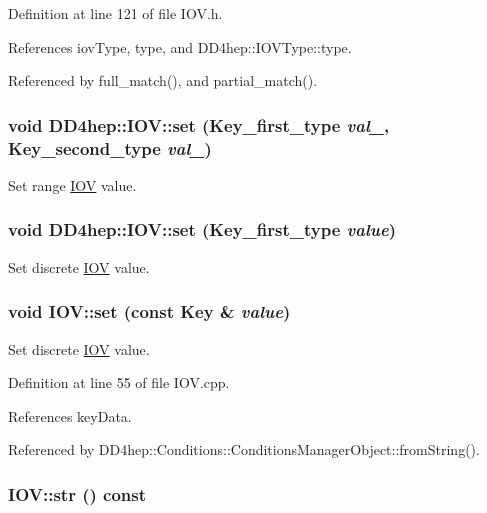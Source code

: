 Definition at line 121 of file IOV.h.

References iovType, type, and DD4hep::IOVType::type.

Referenced by full\_\-match(), and partial\_\-match().\hypertarget{class_d_d4hep_1_1_i_o_v_ab1157ed01d8a99029c6d2cfc9379ac9b}{
\subsubsection[{set}]{\setlength{\rightskip}{0pt plus 5cm}void DD4hep::IOV::set ({\bf Key\_\-first\_\-type} {\em val\_}, \/  {\bf Key\_\-second\_\-type} {\em val\_})}}
\label{class_d_d4hep_1_1_i_o_v_ab1157ed01d8a99029c6d2cfc9379ac9b}


Set range \hyperlink{class_d_d4hep_1_1_i_o_v}{IOV} value. \hypertarget{class_d_d4hep_1_1_i_o_v_a8c9578e074d7c685fd7d1454b6b35d40}{
\subsubsection[{set}]{\setlength{\rightskip}{0pt plus 5cm}void DD4hep::IOV::set ({\bf Key\_\-first\_\-type} {\em value})}}
\label{class_d_d4hep_1_1_i_o_v_a8c9578e074d7c685fd7d1454b6b35d40}


Set discrete \hyperlink{class_d_d4hep_1_1_i_o_v}{IOV} value. \hypertarget{class_d_d4hep_1_1_i_o_v_aa75452d30ebad70f84372091d6f777e4}{
\subsubsection[{set}]{\setlength{\rightskip}{0pt plus 5cm}void IOV::set (const {\bf Key} \& {\em value})}}
\label{class_d_d4hep_1_1_i_o_v_aa75452d30ebad70f84372091d6f777e4}


Set discrete \hyperlink{class_d_d4hep_1_1_i_o_v}{IOV} value. 

Definition at line 55 of file IOV.cpp.

References keyData.

Referenced by DD4hep::Conditions::ConditionsManagerObject::fromString().\hypertarget{class_d_d4hep_1_1_i_o_v_a52ef776877661a865c23e07d2e2c9bef}{
\subsubsection[{str}]{ IOV::str () const}}
\label{class_d_d4hep_1_1_i_o_v_a52ef776877661a865c23e07d2e2c9bef}


